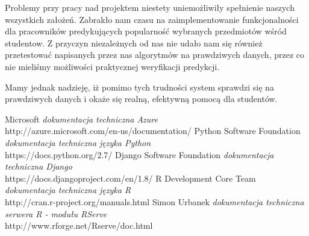 \documentclass[licencjacka]{pracamgr}
\begin{document}
Problemy przy pracy nad projektem niestety uniemożliwiły spełnienie naszych wszystkich założeń. Zabrakło nam czasu na zaimplementowanie funkcjonalności dla pracowników predykujących popularność wybranych przedmiotów wśród studentow. Z przyczyn niezależnych od nas nie udało nam się również przetestować napisanych przez nas algorytmów na prawdziwych danych, przez co nie mieliśmy możliwości praktycznej weryfikacji predykcji. 

Mamy jednak nadzieję, iż pomimo tych trudności system sprawdzi się na prawdziwych danych i okaże się realną, efektywną pomocą dla studentów.


\begin{thebibliography}{99}
 Microsoft
\textit{dokumentacja techniczna Azure} \\
http://azure.microsoft.com/en-us/documentation/
Python Software Foundation
\textit{dokumentacja techniczna języka Python} \\
https://docs.python.org/2.7/
 Django Software Foundation
\textit{dokumentacja techniczna Django} \\ 
https://docs.djangoproject.com/en/1.8/
 R Development Core Team
\textit{dokumentacja techniczna języka R} \\
http://cran.r-project.org/manuals.html
 Simon Urbanek
\textit{dokumentacja techniczna serwera R - modułu RServe} \\
http://www.rforge.net/Rserve/doc.html
\end{thebibliography}
\end{document}
